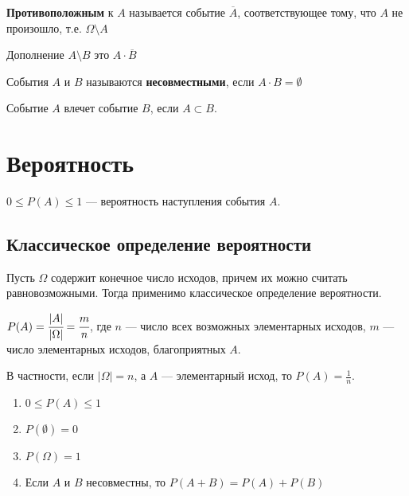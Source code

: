 \documentclass[12pt, a4paper, oneside]{book}
\begin{document}
\begin{definition}
    \textbf{Противоположным} к \(A\) называется событие \(\overline A\), соответствующее тому, что \(A\) не произошло, т.е. \(\Omega\setminus A\)
\end{definition}

\begin{definition}
    Дополнение \(A\setminus B\) это \(A\cdot \overline B\)
\end{definition}

\begin{definition}
    События \(A\) и \(B\) называются \textbf{несовместными}, если \(A\cdot B = \emptyset\)
\end{definition}

\begin{definition}
    Событие \(A\) влечет событие \(B\), если \(A\subset B\).
\end{definition}

\section{Вероятность}

\begin{definition}
    \(0 \leq P(A) \leq 1\) --- вероятность наступления события \(A\).
\end{definition}

\subsection{Классическое определение вероятности}

Пусть \(\Omega\) содержит конечное число исходов, причем их можно считать равновозможными. Тогда применимо классическое определение вероятности.

\(P(A) = \cfrac{|A|}{|\Omega|} = \cfrac{m}{n}\), где \(n\) --- число всех возможных элементарных исходов, \(m\) --- число элементарных исходов, благоприятных \(A\).

В частности, если \(|\Omega|= n\), а \(A\) --- элементарный исход, то \(P(A) = \frac{1}{n}\).

\begin{prop}\itemfix
    \begin{enumerate}
        \item \(0 \leq P(A) \leq 1\)
        \item \(P(\emptyset) = 0\)
        \item \(P(\Omega) = 1\)
        \item Если \(A\) и \(B\) несовместны, то \(P(A + B) = P(A) + P(B)\)
    \end{enumerate}
\end{prop}
\end{document}

